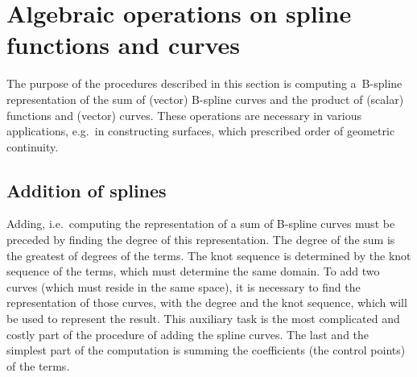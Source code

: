 

\newpage
\section{Algebraic operations on spline functions and curves}

\begin{sloppypar}
The purpose of the procedures described in this section is computing
a~B-spline representation of the sum of (vector) B-spline curves
and the product of (scalar) functions and (vector) curves. These operations
are necessary in various applications, e.g.\ in constructing surfaces, which
prescribed order of geometric continuity.
\end{sloppypar}


\subsection{Addition of splines}

Adding, i.e.\ computing the representation of a sum of B-spline curves
must be preceded by finding the degree of this representation.
The degree of the sum is the greatest of degrees of the terms.
The knot sequence is determined by the knot sequence of the terms, which
must determine the same domain. To add two curves (which must reside in the
same space), it is necessary to find the representation of those curves,
with the degree and the knot sequence, which will be used to represent the
result. This auxiliary task is the most complicated and costly part
of the procedure of adding the spline curves. The last and the simplest
part of the computation is summing the coefficients (the control points)
of the terms.

